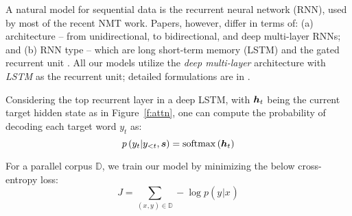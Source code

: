 \documentclass[11pt]{article}
\newcommand{\tgt}[1]{y_{#1}} %
\newcommand{\src}[1]{x_{#1}} %
\newcommand{\MB}[1]{\mbox{\boldmath{$#1$}}} %
\newcommand{\open}[1]{\left(#1\right)} %
\newcommand{\hd}[1]{\MB{h}_{#1}} %
\DeclareMathOperator{\softmax}{softmax}
\begin{document}
A natural model for sequential data is the recurrent
neural network (RNN), used by most of the recent NMT work.
Papers, however, differ in terms of: (a) architecture -- from unidirectional, to
bidirectional, and deep multi-layer RNNs; and (b) RNN type -- which are long
short-term memory (LSTM)
\cite{lstm97} and the gated recurrent unit \cite{cho14}. 
All our models utilize the {\it deep multi-layer} architecture with {\it
LSTM} as the recurrent unit; detailed formulations are in \cite{zaremba14}.


Considering the top recurrent layer in a deep LSTM, 
with $\hd{t}$ being the current target hidden state as in Figure~\ref{f:attn}, one can compute the probability of decoding each target word $y_t$ as:
\begin{equation}
p\left(\tgt{t}|\tgt{<t},\MB{s}\right) = \softmax\open{\hd{t}}
\label{e:softmax}
\end{equation}

For a parallel corpus $\mathbb{D}$, we train our model by minimizing the below
cross-entropy loss:
\begin{equation}
J = \sum_{(\src{},\tgt{}) \in \mathbb{D}} \nolimits -\log p(\tgt{}|\src{})
\label{e:obj}
\end{equation}
\end{document}
